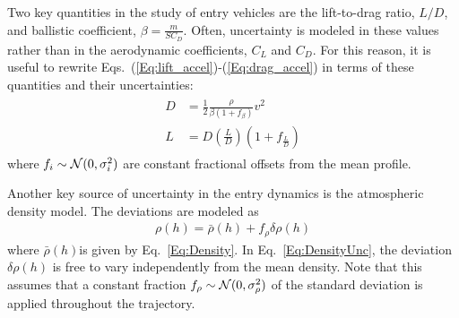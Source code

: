 Two key quantities in the study of entry vehicles are the lift-to-drag ratio, $L/D$, and ballistic coefficient, $\beta = \frac{m}{SC_D}$. Often, uncertainty is modeled in these values rather than in the aerodynamic coefficients, $C_L$ and $C_D$. For this reason, it is useful to rewrite Eqs.~(\ref{Eq:lift_accel})-(\ref{Eq:drag_accel}) in terms of these quantities and their uncertainties:
\begin{align}
	\begin{split}
		D &= \frac{1}{2}\frac{\rho}{\beta(1 + f_{\beta})} v^2 \\
		L &= D(\frac{L}{D})(1+f_{\frac{L}{D}})  \label{Eq:aero_accels}
	\end{split}
\end{align}
where $f_i\sim\mathcal{N}(0, \sigma^2_i)$ are constant fractional offsets from the mean profile.

Another key source of uncertainty in the entry dynamics is the atmospheric density model. The deviations are modeled as 
\begin{align}
	\rho(h) = \bar{\rho}(h) + f_{\rho}\delta\rho(h) \label{Eq:DensityUnc}
\end{align}
where $\bar{\rho}(h)$is given by Eq.~\eqref{Eq:Density}. In Eq.~\eqref{Eq:DensityUnc}, the deviation $\delta\rho(h)$ is free to vary independently from the mean density. Note that this assumes that a constant fraction $f_{\rho}\sim\mathcal{N}(0, \sigma^2_{\rho})$ of the standard deviation is applied throughout the trajectory. 

